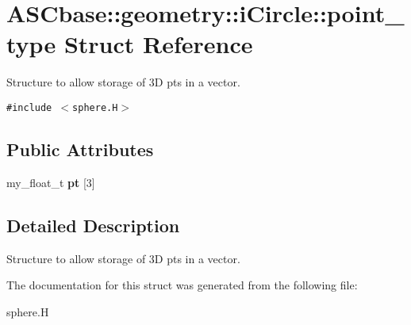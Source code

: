 \section{ASCbase::geometry::i\-Circle::point\_\-type Struct Reference}
\label{structASCbase_1_1geometry_1_1iCircle_1_1point__type}
Structure to allow storage of 3D pts in a vector.  


{\tt \#include $<$sphere.H$>$}

\subsection*{Public Attributes}
\begin{CompactItemize}
\item 
my\_\-float\_\-t \textbf{pt} [3]\label{structASCbase_1_1geometry_1_1iCircle_1_1point__type_b2fba8f10a57aa81097fe33f7026628f}

\end{CompactItemize}


\subsection{Detailed Description}
Structure to allow storage of 3D pts in a vector. 



The documentation for this struct was generated from the following file:\begin{CompactItemize}
\item 
sphere.H\end{CompactItemize}
